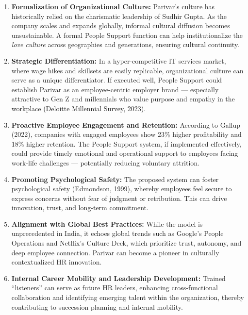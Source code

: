 \documentclass[10pt,a4paper]{book}
\begin{document}
\begin{enumerate}
    \item \textbf{Formalization of Organizational Culture:} Parivar’s culture has historically relied on the charismatic leadership of Sudhir Gupta. As the company scales and expands globally, informal cultural diffusion becomes unsustainable. A formal People Support function can help institutionalize the \textit{love culture} across geographies and generations, ensuring cultural continuity.

    \item \textbf{Strategic Differentiation:} In a hyper-competitive IT services market, where wage hikes and skillsets are easily replicable, organizational culture can serve as a unique differentiator. If executed well, People Support could establish Parivar as an employee-centric employer brand — especially attractive to Gen Z and millennials who value purpose and empathy in the workplace (Deloitte Millennial Survey, 2023).

    \item \textbf{Proactive Employee Engagement and Retention:} According to Gallup (2022), companies with engaged employees show 23\% higher profitability and 18\% higher retention. The People Support system, if implemented effectively, could provide timely emotional and operational support to employees facing work-life challenges — potentially reducing voluntary attrition.

    \item \textbf{Promoting Psychological Safety:} The proposed system can foster psychological safety (Edmondson, 1999), whereby employees feel secure to express concerns without fear of judgment or retribution. This can drive innovation, trust, and long-term commitment.

    \item \textbf{Alignment with Global Best Practices:} While the model is unprecedented in India, it echoes global trends such as Google’s People Operations and Netflix’s Culture Deck, which prioritize trust, autonomy, and deep employee connection. Parivar can become a pioneer in culturally contextualized HR innovation.

    \item \textbf{Internal Career Mobility and Leadership Development:} Trained “listeners” can serve as future HR leaders, enhancing cross-functional collaboration and identifying emerging talent within the organization, thereby contributing to succession planning and internal mobility.

\end{enumerate}
\end{document}
